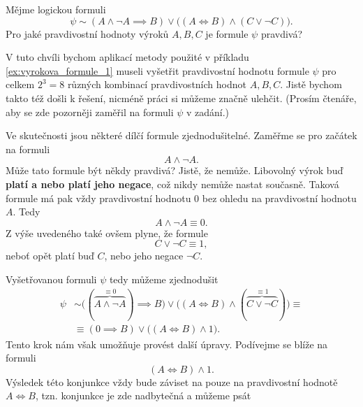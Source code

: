 \begin{example}\label{ex:vyrokova_formule_2}
    Mějme logickou formuli
    \begin{equation*}
        \psi\sim (A \land \neg A \implies B) \lor \big((A \iff B) \land (C \lor \neg C)\big).
    \end{equation*}
    Pro jaké pravdivostní hodnoty výroků $A,B,C$ je formule $\psi$ pravdivá?
    \begin{solution}
        V tuto chvíli bychom aplikací metody použité v příkladu \ref{ex:vyrokova_formule_1} museli vyšetřit pravdivostní hodnotu formule $\psi$ pro celkem $2^3=8$ různých kombinací pravdivostních hodnot $A,B,C$. Jistě bychom takto též došli k řešení, nicméně práci si můžeme značně ulehčit. (Prosím čtenáře, aby se zde pozorněji zaměřil na formuli $\psi$ v zadání.)\par
        Ve skutečnosti jsou některé dílčí formule zjednodušitelné. Zaměřme se pro začátek na formuli
        \begin{equation*}
            A \land \neg A.
        \end{equation*}
        Může tato formule být někdy pravdivá? Jistě, že nemůže. Libovolný výrok buď \textbf{platí a nebo platí jeho negace}, což nikdy nemůže nastat současně. Taková formule má pak vždy pravdivostní hodnotu 0 bez ohledu na pravdivostní hodnotu $A$. Tedy
        \begin{equation*}
            A \land \neg A\equiv 0.
        \end{equation*}
        Z výše uvedeného také ovšem plyne, že formule
        \begin{equation*}
            C \lor \neg C\equiv 1,
        \end{equation*}
        neboť opět platí buď $C$, nebo jeho negace $\neg C$.\par
        Vyšetřovanou formuli $\psi$ tedy můžeme zjednodušit
        \begin{align*}
            \psi&\sim \big((\overbrace{A \land \neg A}^{\equiv 0}) \implies B\big) \lor \big((A \iff B) \land (\overbrace{C \lor \neg C}^{\equiv 1})\big)\equiv  \\ &\equiv (0 \implies B) \lor \big((A \iff B) \land 1\big).
        \end{align*}
        Tento krok nám však umožňuje provést další úpravy. Podívejme se blíže na formuli
        \begin{equation*}
            (A \iff B) \land 1.
        \end{equation*}
        Výsledek této konjunkce vždy bude záviset na pouze na pravdivostní hodnotě $A \iff B$, tzn. konjunkce je zde nadbytečná a můžeme psát

\end{solution}
\end{example}
